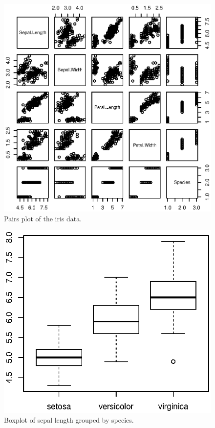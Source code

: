\documentclass[a4paper]{article}
\begin{document}
\begin{figure}[htbp]
  \begin{center}
\includegraphics{brew-test-1-1}
    \caption{Pairs plot of the iris data.}
  \end{center}
\end{figure}


\begin{figure}[htbp]
  \begin{center}
\includegraphics{brew-test-1-2}
    \caption{Boxplot of sepal length grouped by species.}
  \end{center}
\end{figure}
\end{document}

